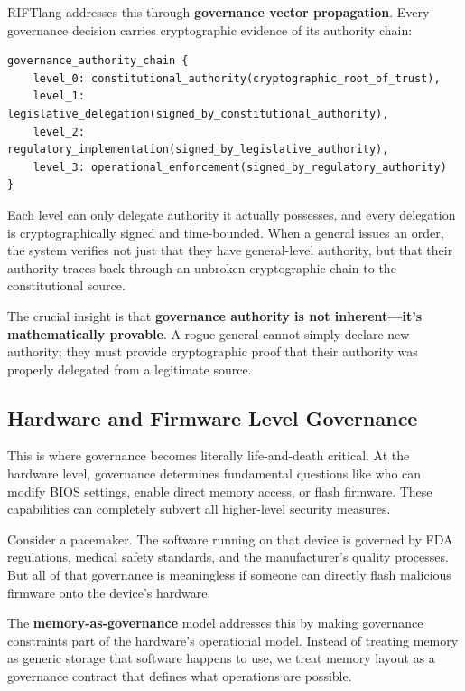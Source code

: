 RIFTlang addresses this through \textbf{governance vector propagation}. Every governance decision carries cryptographic evidence of its authority chain:

\begin{lstlisting}[language=rift]
governance_authority_chain {
    level_0: constitutional_authority(cryptographic_root_of_trust),
    level_1: legislative_delegation(signed_by_constitutional_authority),
    level_2: regulatory_implementation(signed_by_legislative_authority),
    level_3: operational_enforcement(signed_by_regulatory_authority)
}
\end{lstlisting}

Each level can only delegate authority it actually possesses, and every delegation is cryptographically signed and time-bounded. When a general issues an order, the system verifies not just that they have general-level authority, but that their authority traces back through an unbroken cryptographic chain to the constitutional source.

The crucial insight is that \textbf{governance authority is not inherent—it's mathematically provable}. A rogue general cannot simply declare new authority; they must provide cryptographic proof that their authority was properly delegated from a legitimate source.

\subsection{Hardware and Firmware Level Governance}

This is where governance becomes literally life-and-death critical. At the hardware level, governance determines fundamental questions like who can modify BIOS settings, enable direct memory access, or flash firmware. These capabilities can completely subvert all higher-level security measures.

Consider a pacemaker. The software running on that device is governed by FDA regulations, medical safety standards, and the manufacturer's quality processes. But all of that governance is meaningless if someone can directly flash malicious firmware onto the device's hardware.

The \textbf{memory-as-governance} model addresses this by making governance constraints part of the hardware's operational model. Instead of treating memory as generic storage that software happens to use, we treat memory layout as a governance contract that defines what operations are possible.

